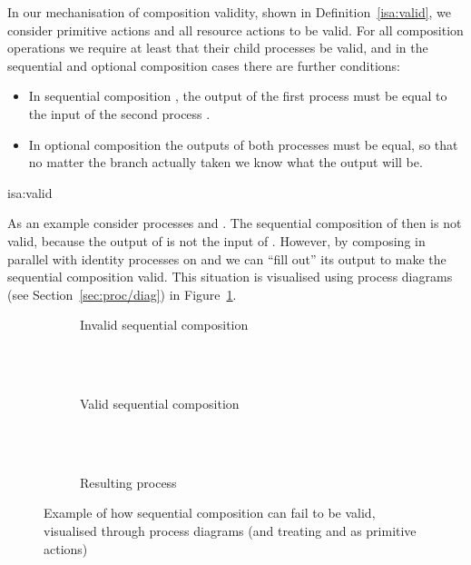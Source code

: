 \documentclass[class=smolathesis,crop=false]{standalone}
\begin{document}
In our mechanisation of composition validity, shown in Definition~\ref{isa:valid}, we consider primitive actions and all resource actions to be valid.
For all composition operations we require at least that their child processes be valid, and in the sequential and optional composition cases there are further conditions:
\begin{itemize}
  \item In sequential composition , the output of the first process  must be equal to the input of the second process .
  \item In optional composition  the outputs of both processes must be equal, so that no matter the branch actually taken we know what the output will be.
\end{itemize}

\begin{isadef}{isa:valid}
  
\end{isadef}

As an example consider processes  and .
The sequential composition of  then  is not valid, because the output of  is not the input of .
However, by composing  in parallel with identity processes on  and  we can ``fill out'' its output to make the sequential composition valid.
This situation is visualised using process diagrams (see Section~\ref{sec:proc/diag}) in Figure~\ref{fig:seq_fix}.

\begin{figure}[htbp]
  \begin{subfigure}{\textwidth}
  \centering
    
    \caption{Invalid sequential composition}
  \end{subfigure}
  \\~\\
  \begin{subfigure}{\textwidth}
  \centering
    
    \caption{Valid sequential composition}
  \end{subfigure}
  \\~\\
  \begin{subfigure}{\textwidth}
  \centering
    
    \caption{Resulting process}
  \end{subfigure}
  \caption{Example of how sequential composition can fail to be valid, visualised through process diagrams (and treating  and  as primitive actions)}
  \label{fig:seq_fix}
\end{figure}
\end{document}
